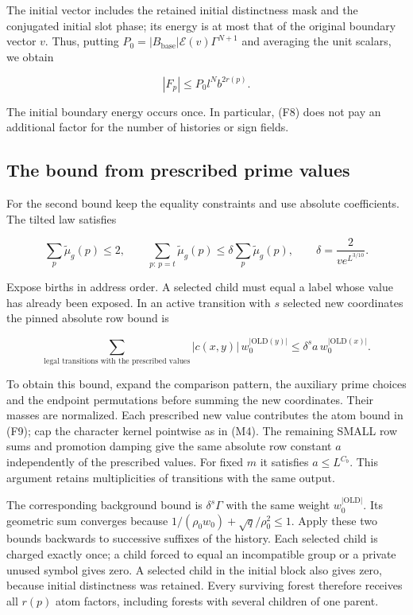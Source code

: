 The initial vector includes the retained initial distinctness mask and
the conjugated initial slot phase; its energy is at most that of the
original boundary vector \(v\). Thus, putting
\(P_0=|B_{\mathrm{base}}|\mathcal E(v)\Gamma^{N+1}\) and averaging the
unit scalars, we obtain

\[
|F_p|\le P_0 l^N b^{2r(p)}. \tag{F8}
\]

The initial boundary energy occurs once. In particular, (F8) does not
pay an additional factor for the number of histories or sign fields.


\hypertarget{forest-moments-the-bound-from-prescribed-prime-values}{%
\subsection{The bound from prescribed prime
values}\label{forest-moments-the-bound-from-prescribed-prime-values}}

For the second bound keep the equality constraints and use absolute
coefficients. The tilted law satisfies

\[
\sum_p\widetilde\mu_g(p)\le2,\qquad
\sum_{p:\,p=t}\widetilde\mu_g(p)
 \le\delta\sum_p\widetilde\mu_g(p),\qquad
\delta=\frac2{v e^{L^{3/10}}}. \tag{F9}
\]

Expose births in address order. A selected child must equal a label
whose value has already been exposed. In an active transition with \(s\)
selected new coordinates the pinned absolute row bound is

\[
\sum_{\text{legal transitions with the prescribed values}}
 |c(x,y)|\,w_0^{|\mathrm{OLD}(y)|}
 \le \delta^s a\,w_0^{|\mathrm{OLD}(x)|}. \tag{F10}
\]

To obtain this bound, expand the comparison pattern, the auxiliary prime
choices and the endpoint permutations before summing the new
coordinates. Their masses are normalized. Each prescribed new value
contributes the atom bound in (F9); cap the character kernel pointwise
as in (M4). The remaining SMALL row sums and promotion damping give the
same absolute row constant \(a\) independently of the prescribed values.
For fixed \(m\) it satisfies \(a\le L^{C_b}\). This argument retains
multiplicities of transitions with the same output.

The corresponding background bound is \(\delta^s\Gamma\) with the same
weight \(w_0^{|\mathrm{OLD}|}\). Its geometric sum converges because
\(1/(\rho_0w_0)+\sqrt q/\rho_0^2\le1\). Apply these two bounds backwards
to successive suffixes of the history. Each selected child is charged
exactly once; a child forced to equal an incompatible group or a private
unused symbol gives zero. A selected child in the initial block also
gives zero, because initial distinctness was retained. Every surviving
forest therefore receives all \(r(p)\) atom factors, including forests
with several children of one parent.

